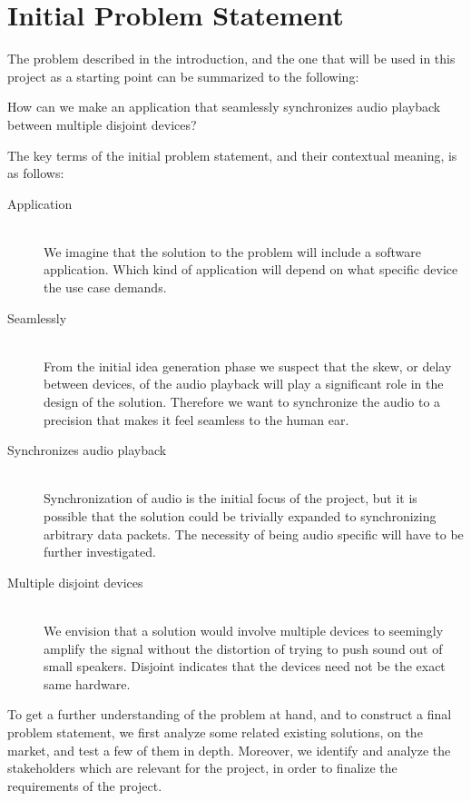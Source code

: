 \section{Initial Problem Statement}\label{sec:initial_problem}

The problem described in the introduction, and the one that will be used
in this project as a starting point can be summarized to the following:

\begin{problemstatement}
	How can we make an application that seamlessly synchronizes audio
	playback between multiple disjoint devices?
\end{problemstatement}

The key terms of the initial problem statement, and their contextual meaning,
is as follows:
\begin{description}
	\item[Application] \hfill \\
		We imagine that the solution to the problem will include a software
		application. Which kind of application will depend on what specific
		device the use case demands.
	\item[Seamlessly]  \hfill \\
		From the initial idea generation phase we suspect
		that the skew, or delay between devices, of the audio playback will
		play a significant role in the design of the solution. Therefore we
		want to synchronize the audio to a precision that makes it feel
		seamless to the human ear.
	\item[Synchronizes audio playback]  \hfill \\
		Synchronization of audio is the initial
		focus of the project, but it is possible that the solution could be
		trivially expanded to synchronizing arbitrary data packets. The
		necessity of being audio specific will have to be further investigated.
	\item[Multiple disjoint devices]  \hfill \\
		We envision that a solution would involve multiple devices to seemingly 
		amplify the signal without the distortion of trying to push sound out of
		small speakers. Disjoint indicates that the devices need not be the 
		exact same hardware. 
\end{description}

To get a further understanding of the problem at hand, and to
construct a final problem statement, we first analyze some related
existing solutions, on the market, and test a few of them in depth. 
Moreover, we identify and analyze the stakeholders which are relevant for the project,
in order to finalize the requirements of the project.
